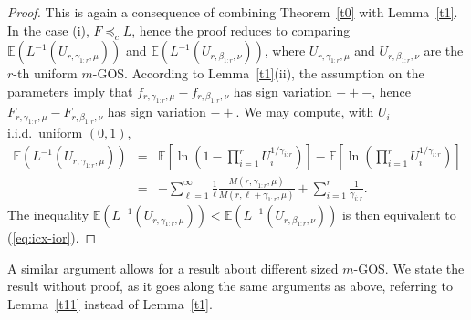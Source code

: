 \documentclass [11pt]{article}
\newcommand{\gos}{GOS}
\begin{document}
\begin{proof}
This is again a consequence of combining Theorem~\ref{t0} with Lemma~\ref{t1}. In the case (i), $F\preceq_c L$, hence the proof reduces to comparing $\mathbb{E}(L^{-1}(U_{r,\gamma_{1:r},\mu}))$ and $\mathbb{E}(L^{-1}(U_{r,\beta_{1:r},\nu}))$, where $U_{r,\gamma_{1:r},\mu}$ and $U_{r,\beta_{1:r},\nu}$  are the $r$-th uniform $m$-\gos. According to Lemma~\ref{t1}(ii), the assumption on the parameters imply that $f_{r,\gamma_{1:r},\mu}-f_{r,\beta_{1:r},\nu}$ has sign variation $-+-$, hence $F_{r,\gamma_{1:r},\mu}-F_{r,\beta_{1:r},\nu}$ has sign variation $-+$. We may compute, with $U_i$ i.i.d.\ uniform $(0,1)$,
\begin{eqnarray*}
\mathbb{E}(L^{-1}(U_{r,\gamma_{1:r},\mu})) & = & 
   \mathbb{E}\left[\ln\left(1-\prod_{i=1}^r U_i^{1/\gamma_{i:r}}\right)\right]
 -\mathbb{E}\left[\ln\left(\prod_{i=1}^r U_i^{1/\gamma_{i:r}}\right)\right]  \\[1.25ex]
  & = &  -\sum_{\ell=1}^\infty\frac1\ell \frac{M(r,\gamma_{1:r},\mu)}{M(r,\ell+\gamma_{1:r},\mu)}
+ \sum_{i=1}^r\frac1{\gamma_{i:r}}.
\end{eqnarray*}
The inequality $\mathbb{E}(L^{-1}(U_{r,\gamma_{1:r},\mu}))<\mathbb{E}(L^{-1}(U_{r,\beta_{1:r},\nu}))$ 
is then equivalent to (\ref{eq:icx-ior}).
\end{proof}
A similar argument allows for a result about different sized $m$-\gos. We state the result without proof, as it goes along the same arguments as above, referring to Lemma~\ref{t11} instead of Lemma~\ref{t1}.
\end{document}
